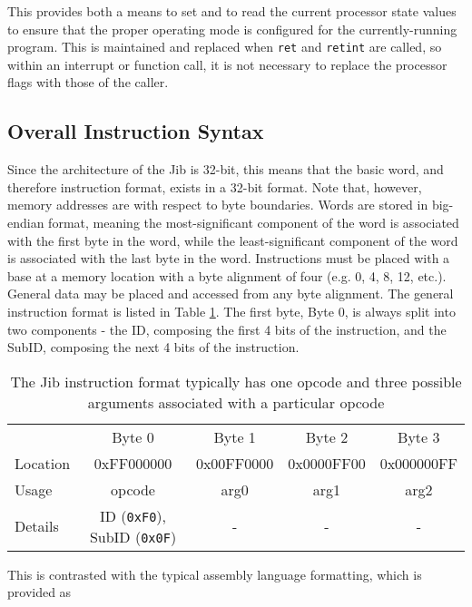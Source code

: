 \documentclass{article}
\begin{document}
This provides both a means to set and to read the current processor state values to ensure that the proper operating mode is configured for the currently-running program. This is maintained and replaced when \texttt{ret} and \texttt{retint} are called, so within an interrupt or function call, it is not necessary to replace the processor flags with those of the caller.

\subsection{Overall Instruction Syntax}

Since the architecture of the Jib is 32-bit, this means that the basic word, and therefore instruction format, exists in a 32-bit format. Note that, however, memory addresses are with respect to byte boundaries. Words are stored in big-endian format, meaning the most-significant component of the word is associated with the first byte in the word, while the least-significant component of the word is associated with the last byte in the word. Instructions must be placed with a base at a memory location with a byte alignment of four (e.g. 0, 4, 8, 12, etc.). General data may be placed and accessed from any byte alignment. The general instruction format is listed  in Table \ref{table:instruction-formatting}. The first byte, Byte 0, is always split into two components - the ID, composing the first 4 bits of the instruction, and the SubID, composing the next 4 bits of the instruction.

\begin{table}[h!]
    \centering
    \begin{tabular}{l|cccc}
        \hline
        {} & Byte 0 & Byte 1 & Byte 2 & Byte 3 \\
        Location & 0xFF000000 & 0x00FF0000 & 0x0000FF00 & 0x000000FF \\
        \hline
        Usage & opcode & arg0 & arg1 & arg2 \\
        Details & ID (\texttt{0xF0}), SubID (\texttt{0x0F}) & - & - & - \\
        \hline
    \end{tabular}
    \caption{The Jib instruction format typically has one opcode and three possible arguments associated with a particular opcode}
    \label{table:instruction-formatting}
\end{table}

This is contrasted with the typical assembly language formatting, which is provided as
\end{document}
